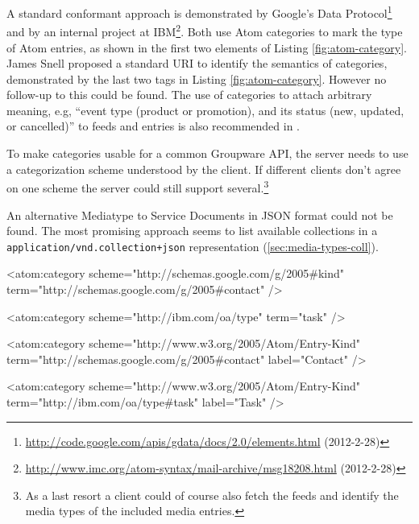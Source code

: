 \documentclass[11pt,a4paper,headsepline,twoside]{scrartcl}		%
\newcommand{\citeurl}[2]{\url{#1} (#2)}
\begin{document}
A standard conformant approach is demonstrated by Google's Data
Protocol\footnote{\citeurl{http://code.google.com/apis/gdata/docs/2.0/elements.html}{2012-2-28}}
and by an internal project at
IBM\footnote{\label{snellatomcategory}\citeurl{http://www.imc.org/atom-syntax/mail-archive/msg18208.html}{2012-2-28}}. Both
use Atom categories\cite[sec. 8.3.6]{RFC5023} to mark the type of Atom entries,
as shown in the first two elements of Listing \ref{fig:atom-category}. James
Snell proposed a standard URI to identify the semantics of
categories, demonstrated by the last two tags in
Listing \ref{fig:atom-category}. However no follow-up to this could be
found. The use of categories to attach arbitrary meaning, e.g, ``event type
(product or promotion), and its status (new, updated, or cancelled)'' to feeds
and entries is also recommended in \cite[p. 200]{Webber2010}.

To make categories usable for a common Groupware API, the server needs to use a
categorization scheme understood by the client. If different clients don't agree
on one scheme the server could still support several.\footnote{As a last resort
  a client could of course also fetch the feeds and identify the media types of
  the included media entries.}

An alternative Mediatype to Service Documents in JSON format could not be
found. The most promising approach seems to list available collections in a
\lstinline:application/vnd.collection+json: representation
(\autoref{sec:media-types-coll}).

\begin{anylisting}[label=fig:atom-category,
                   caption={ATOM categories as used by Google and IBM to mark entry
                            types and a proposal to use a standard scheme URI for type terms}]
<atom:category
    scheme="http://schemas.google.com/g/2005#kind"
    term="http://schemas.google.com/g/2005#contact" />

<atom:category 
    scheme="http://ibm.com/oa/type"
    term="task" />

<atom:category 
    scheme="http://www.w3.org/2005/Atom/Entry-Kind"
    term="http://schemas.google.com/g/2005#contact"
    label="Contact" />

<atom:category
     scheme="http://www.w3.org/2005/Atom/Entry-Kind"
     term="http://ibm.com/oa/type#task"
     label="Task" />
\end{anylisting}
\end{document}
